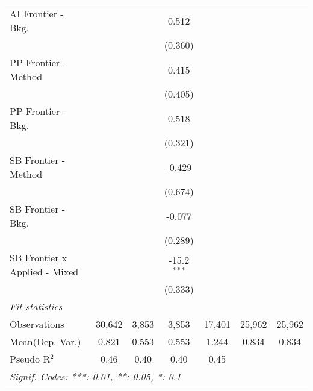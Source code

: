 \begin{tabular}{lcccccc}
   AI Frontier - Bkg.            &               &             & 0.512         &               &        &   \\   
                                 &               &             & (0.360)       &               &        &   \\   
   PP Frontier - Method          &               &             & 0.415         &               &        &   \\   
                                 &               &             & (0.405)       &               &        &   \\   
   PP Frontier - Bkg.            &               &             & 0.518         &               &        &   \\   
                                 &               &             & (0.321)       &               &        &   \\   
   SB Frontier - Method          &               &             & -0.429        &               &        &   \\   
                                 &               &             & (0.674)       &               &        &   \\   
   SB Frontier - Bkg.            &               &             & -0.077        &               &        &   \\   
                                 &               &             & (0.289)       &               &        &   \\   
   SB Frontier x Applied - Mixed &               &             & -15.2$^{***}$ &               &        &   \\   
                                 &               &             & (0.333)       &               &        &   \\   
   \midrule
   \emph{Fit statistics}\\
   Observations                  & 30,642        & 3,853       & 3,853         & 17,401        & 25,962 & 25,962\\  
Mean(Dep. Var.) & 0.821 & 0.553 & 0.553 & 1.244 & 0.834 & 0.834 \\
   Pseudo R$^2$                  & 0.46          & 0.40        & 0.40          & 0.45          &        & \\  
   \midrule \midrule
   \multicolumn{7}{l}{\emph{Signif. Codes: ***: 0.01, **: 0.05, *: 0.1}}\\
\end{tabular}
\par\endgroup
